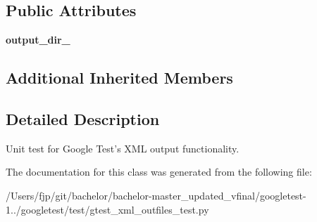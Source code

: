 \subsection*{Public Attributes}
\begin{DoxyCompactItemize}
\item 
\mbox{\label{classgtest__xml__outfiles__test_1_1_g_test_x_m_l_out_files_test_aa5c31cd97047bc1d3060f4d27bc956a4}} 
{\bfseries output\+\_\+dir\+\_\+}
\end{DoxyCompactItemize}
\subsection*{Additional Inherited Members}


\subsection{Detailed Description}
\begin{DoxyVerb}Unit test for Google Test's XML output functionality.\end{DoxyVerb}
 

The documentation for this class was generated from the following file\+:\begin{DoxyCompactItemize}
\item 
/\+Users/fjp/git/bachelor/bachelor-\/master\+\_\+updated\+\_\+vfinal/googletest-\/1../googletest/test/gtest\+\_\+xml\+\_\+outfiles\+\_\+test.\+py\end{DoxyCompactItemize}
